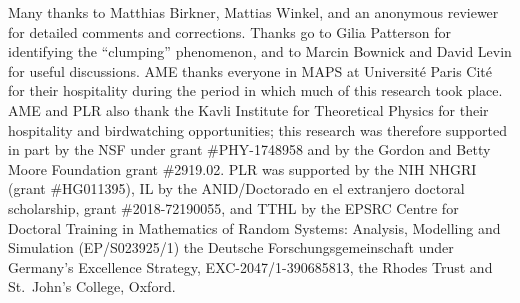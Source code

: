 \documentclass[EJP]{ejpecp} %
\begin{document}
\begin{acks}
Many thanks to Matthias Birkner, Mattias Winkel, and an anonymous reviewer
for detailed comments and corrections.
Thanks go to Gilia Patterson for identifying the ``clumping'' phenomenon,
and to Marcin Bownick and David Levin for useful discussions.
AME thanks everyone in MAPS at Universit\'e Paris Cit\'e for their hospitality
during the period in which much of this research took place.
AME and PLR also thank the Kavli Institute for Theoretical Physics
for their hospitality and birdwatching opportunities;
this research was therefore supported in part by the NSF under grant \#PHY-1748958
and by the Gordon and Betty Moore Foundation grant \#2919.02.
PLR was supported by the NIH NHGRI (grant \#HG011395),
IL by the ANID/Doctorado en el extranjero doctoral scholarship, grant \#2018-72190055,
and TTHL by the EPSRC Centre for Doctoral Training in Mathematics of Random Systems: Analysis, Modelling and Simulation (EP/S023925/1)
the Deutsche Forschungsgemeinschaft under Germany's Excellence Strategy, EXC-2047/1-390685813,
the Rhodes Trust and St.~John's College, Oxford.
\end{acks}



\end{document}
